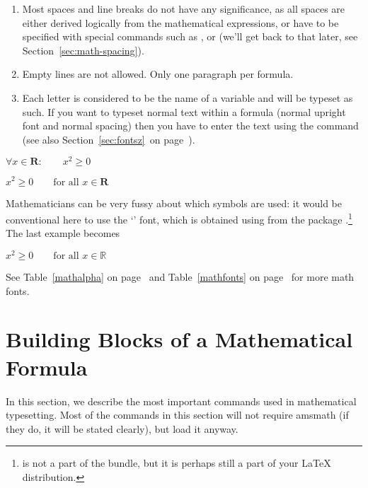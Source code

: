\begin{enumerate}

  \item{} Most spaces and line breaks do not have any significance, as all spaces
  are either derived logically from the mathematical expressions, or
  have to be specified with special commands such as \ci{,},  or
   (we'll get back to that later, see Section~\ref{sec:math-spacing}).

  \item Empty lines are not allowed. Only one paragraph per formula.

  \item Each letter is considered to be the name of a variable and will be
        typeset as such. If you want to typeset normal text within a formula
        (normal upright font and normal spacing) then you have to enter the
        text using the  command (see also Section~\ref{sec:fontsz}~on
        page~\pageref{sec:fontsz}).

\end{enumerate}
\begin{example}
$\forall x \in \mathbf{R}\colon
 \qquad x^{2} \geq 0$
\end{example}
\begin{example}
$x^{2} \geq 0\qquad
 \text{for all }x\in\mathbf{R}$
\end{example}

Mathematicians can be very fussy about which symbols are used:
it would be conventional here to use the `' font,%
 which is obtained using  from the
package .\footnote{ is not a part
  of the  bundle, but it is perhaps still a part of your \LaTeX{}
  distribution.}
\ifx\mathbb\undefined\else
  The last example becomes
  \begin{example}
$x^{2} \geq 0\qquad
 \text{for all } x 
 \in \mathbb{R}$
\end{example}
\fi
See Table~\ref{mathalpha} on page~\pageref{mathalpha} and
Table~\ref{mathfonts} on page~\pageref{mathfonts} for more math fonts.



\section{Building Blocks of a Mathematical Formula}

In this section, we describe the most important commands used in mathematical
typesetting. Most of the commands in this section will not require
\textsf{amsmath} (if they do, it will be stated clearly), but load it anyway.


